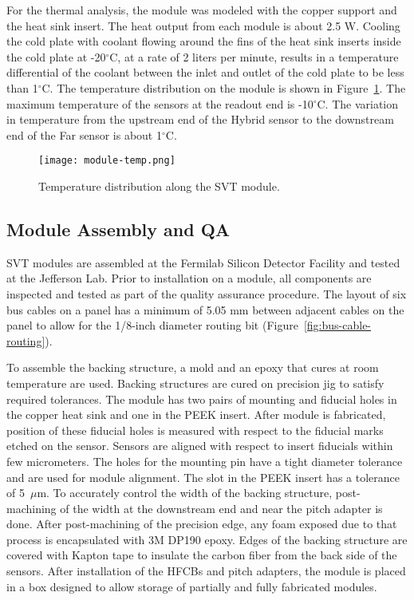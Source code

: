 For the thermal analysis, the module was modeled with the copper support and the heat sink insert. The heat output from each module is about 2.5 W. Cooling the cold plate with coolant flowing around the fins of the heat sink inserts inside the cold plate at -20$^\circ$C, at a rate of 2 liters per minute, results in a temperature differential of the coolant between the inlet and outlet of the cold plate to be less than 1$^\circ$C. The temperature distribution on the module is shown in Figure~\ref{fig:module-temp}. The maximum temperature of the sensors at the readout end is -10$^\circ$C. The variation in temperature from the upstream end of the Hybrid sensor to the downstream end of the Far sensor is about 1$^\circ$C.

\begin{figure}[hbt] 
\centering 
\texttt{[image: module-temp.png]}
\caption{Temperature distribution along the SVT module.}
\label{fig:module-temp}
\end{figure}

\subsection{Module Assembly and QA}

SVT modules are assembled at the Fermilab Silicon Detector Facility and tested at the Jefferson Lab. Prior to installation on a module, all components are inspected and tested as part of the quality assurance procedure.  
The layout of six bus cables on a panel has a minimum of 5.05 mm between adjacent cables on the panel to allow for the 1/8-inch diameter routing bit (Figure~\ref{fig:bus-cable-routing}).

To assemble the backing structure, a mold and an epoxy that cures at room temperature are used. Backing structures are cured on precision jig to satisfy required tolerances. The module has two pairs of mounting and fiducial holes in the copper heat sink and one in the PEEK insert. After module is fabricated, position of these fiducial holes is measured with respect to the fiducial marks etched on the sensor. Sensors are aligned with respect to insert fiducials within few micrometers. The holes for the mounting pin have a tight diameter tolerance and are used for module alignment. The slot in the PEEK insert has a tolerance of 5~$\mu$m. To accurately control the width of the backing structure, post-machining of the width at the downstream end and near the pitch adapter is done. After post-machining of the precision edge, any foam exposed due to that process is encapsulated with 3M DP190 epoxy. Edges of the backing structure are covered with Kapton tape to insulate the carbon fiber from the back side of the sensors. After installation of the HFCBs and pitch adapters, the module is placed in a box designed to allow storage of partially and fully fabricated modules.

